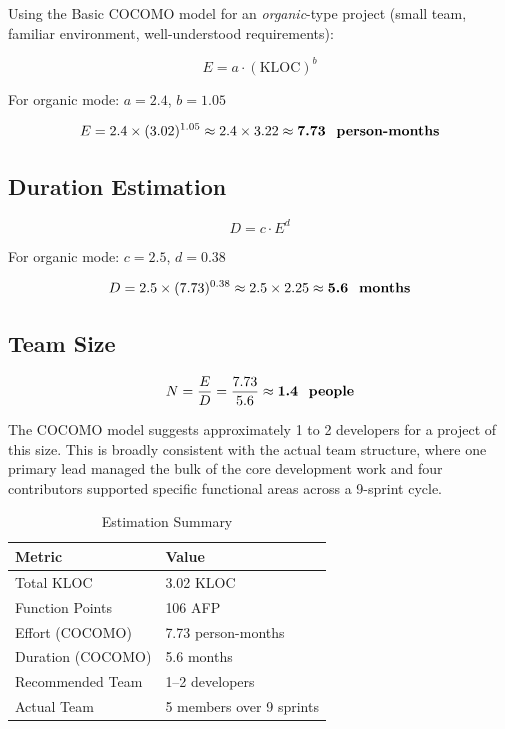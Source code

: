 \documentclass[12pt, a4paper]{article}
\begin{document}
Using the Basic COCOMO model for an \textit{organic}-type project (small team, familiar environment, well-understood requirements):

\[
  E = a \cdot (\text{KLOC})^b
\]

For organic mode: $a = 2.4$, $b = 1.05$

\[
  E = 2.4 \times (3.02)^{1.05} \approx 2.4 \times 3.22 \approx \textbf{7.73 \text{ person-months}}
\]

\subsection{Duration Estimation}

\[
  D = c \cdot E^d
\]

For organic mode: $c = 2.5$, $d = 0.38$

\[
  D = 2.5 \times (7.73)^{0.38} \approx 2.5 \times 2.25 \approx \textbf{5.6 \text{ months}}
\]

\subsection{Team Size}

\[
  N = \frac{E}{D} = \frac{7.73}{5.6} \approx \textbf{1.4 \text{ people}}
\]

The COCOMO model suggests approximately 1 to 2 developers for a project of this size. This is broadly consistent with the actual team structure, where one primary lead managed the bulk of the core development work and four contributors supported specific functional areas across a 9-sprint cycle.

\begin{table}[H]
\centering
\caption{Estimation Summary}
\begin{tabularx}{\textwidth}{lX}
\toprule
\textbf{Metric} & \textbf{Value} \\
\midrule
Total KLOC        & 3.02 KLOC \\
Function Points   & 106 AFP \\
Effort (COCOMO)   & 7.73 person-months \\
Duration (COCOMO) & 5.6 months \\
Recommended Team  & 1--2 developers \\
Actual Team       & 5 members over 9 sprints \\
\bottomrule
\end{tabularx}
\end{table}

\end{document}
